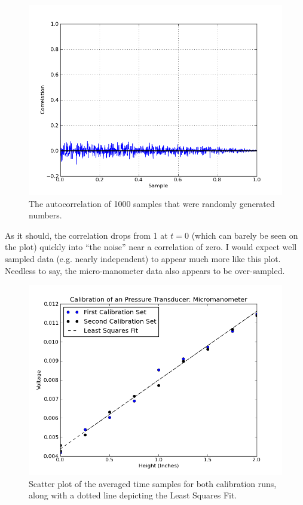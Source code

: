 \documentclass{article}
\begin{document}
  \begin{figure}[!htb]
   \begin{center}
    \includegraphics[width = 12 cm]{figs/random.png}
    \caption{The autocorrelation of 1000 samples that were randomly
    generated numbers.}
    \label{random}
   \end{center}
  \end{figure}

As it should, the correlation drops from 1 at $t=0$ (which can barely be
seen on the plot) quickly into ``the
noise'' near a correlation of zero. I would expect well sampled data
(e.g. nearly independent) to appear much more like this plot. Needless
to say, the micro-manometer data also appears to be over-sampled. 

  \begin{figure}[!htb]
   \begin{center}
    \includegraphics[width = 12 cm]{figs/micro.png}
    \caption{Scatter plot of the averaged time samples for both
    calibration runs, along with a dotted line depicting the Least
    Squares Fit.}
    \label{micro}
   \end{center}
  \end{figure}
\end{document}
